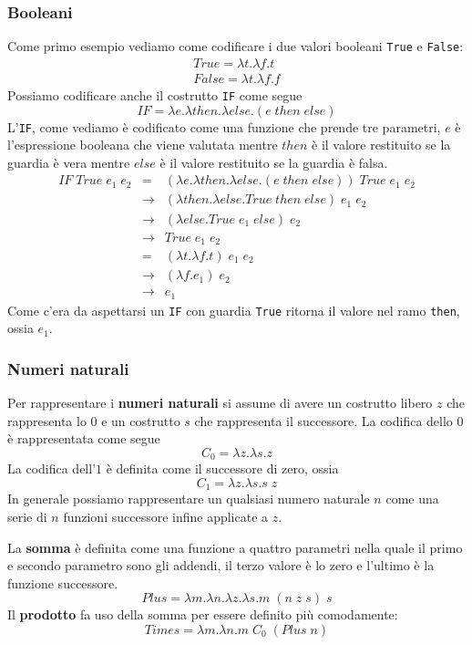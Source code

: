 \subsubsection{Booleani}
Come primo esempio vediamo come codificare i due valori booleani \verb|True| e \verb|False|:
\begin{gather*}
	True = \lambda t.\lambda f.t \\
	False = \lambda t. \lambda f.f
\end{gather*}
Possiamo codificare anche il costrutto \verb|IF| come segue
\[ IF = \lambda e.\lambda then.\lambda else.(e \; then \; else) \]
L'\verb|IF|, come vediamo è codificato come una funzione che prende tre parametri, $e$ è l'espressione booleana
che viene valutata mentre $then$ è il valore restituito se la guardia è vera mentre $else$ è il valore restituito
se la guardia è falsa.
\[
	\begin{array}{rcl}
		IF \; True \; e_1 \; e_2 & =           &
		(\lambda e.\lambda then.\lambda else.(e \; then \; else)) \; True \; e_1 \; e_2                         \\
		                         & \rightarrow & (\lambda then.\lambda else.True \; then \; else) \; e_1 \; e_2 \\
		                         & \rightarrow & (\lambda else.True \; e_1 \; else) \; e_2                      \\
		                         & \rightarrow & True \; e_1 \; e_2                                             \\
		                         & =           & (\lambda t.\lambda f.t) \; e_1 \; e_2                          \\
		                         & \rightarrow & (\lambda f.e_1) \; e_2                                         \\
		                         & \rightarrow & e_1
	\end{array}
\]
Come c'era da aspettarsi un \verb|IF| con guardia \verb|True| ritorna il valore nel ramo \verb|then|, ossia $e_1$.

\subsubsection{Numeri naturali}
Per rappresentare i \textbf{numeri naturali} si assume di avere un costrutto libero $z$ che rappresenta lo $0$ e un
costrutto $s$ che rappresenta il successore. La codifica dello $0$ è rappresentata come segue
\[ C_0 = \lambda z.\lambda s.z \]
La codifica dell'$1$ è definita come il successore di zero, ossia
\[ C_1 = \lambda z.\lambda s.s \; z \]
In generale possiamo rappresentare un qualsiasi numero naturale $n$ come una serie di $n$ funzioni successore infine
applicate a $z$.

La \textbf{somma} è definita come una funzione a quattro parametri nella quale il primo e secondo parametro sono gli
addendi, il terzo valore è lo zero e l'ultimo è la funzione successore.
\[ Plus = \lambda m.\lambda n.\lambda z.\lambda s. m \; (n \; z \; s) \; s \]
Il \textbf{prodotto} fa uso della somma per essere definito più comodamente:
\[ Times = \lambda m.\lambda n.m \; C_0 \; (Plus \; n) \]